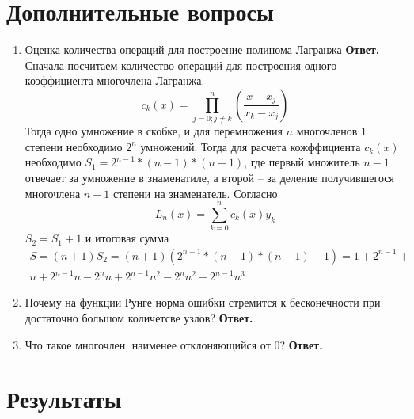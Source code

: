 \documentclass{article}
\begin{document}
    \section{Дополнительные вопросы}
    \begin{enumerate}
        \item Оценка количества операций для построение полинома Лагранжа
        \newline
        {\bfseries Ответ. } 
        Сначала посчитаем количество операций для построения одного коэффициента многочлена Лагранжа.
        \begin{equation*}
            c_k(x) = \prod_{j=0;j\neq k}^{n} \left(\dfrac{x-x_j}{x_k - x_j}\right)
        \end{equation*}
        Тогда одно умножение в скобке, и для перемножения $n$ многочленов 1 степени необходимо $2^n$ умножений. Тогда для 
        расчета кожффициента $ c_k(x)$ необходимо $S_1 = 2^{n-1} * (n-1) * (n-1)$, где 
        первый множитель $n-1$ отвечает за умножение в знаменатиле, а второй -- за деление получившегося многочлена $n-1$ степени 
        на знаменатель. 
        Согласно
        \begin{equation*}
            L_n(x) = \sum_{k=0}^{n} c_k(x)  y_k
        \end{equation*}
        $S_2 = S_1 + 1$ и итоговая сумма 
        \begin{gather*}
            S = (n+1)S_2 = (n+1)( 2^{n-1} * (n-1) * (n-1) + 1) = 1 + 2^{n-1} +\\ 
            n + 2^{n-1} n - 2^n n + 2^{n-1} n^2 - 
            2^n n^2 + 2^{n-1} n^3
        \end{gather*}
        \item Почему на функции Рунге норма ошибки стремится к бесконечности при достаточно большом количетсве узлов?
        \newline
        {\bfseries Ответ. } 
        \item Что такое многочлен, наименее отклоняющийся от 0?  
             \newline
        {\bfseries Ответ. } 
    \end{enumerate}
    \newpage


    \section{Результаты}
\end{document}
